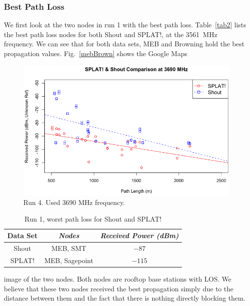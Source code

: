 \subsubsection{Best Path Loss}
We first look at the two nodes in run 1 with the best path loss. Table~\ref{tab2} lists the best path loss nodes for both Shout and 
SPLAT!, at the 3561~MHz frequency. We can see that for both data sets, MEB and Browning hold the best propagation values. 
Fig.~\ref{mebBrown} shows the Google Maps
\begin{figure}[htbp]
\centerline{\includegraphics[width=0.9\columnwidth]{figs/3690.png}}
\vspace{-3mm}
\caption{Run 4. Used 3690 MHz frequency.}
\label{3690}
\vspace{-3mm}
\end{figure}
\begin{table}[htbp]
\caption{Run 1, worst path loss for Shout and SPLAT!}
\begin{center}
\begin{tabular}{|c|c|c|}
\hline
\textbf{Data Set} & \textbf{\textit{Nodes}}& \textbf{\textit{Received Power (dBm)}} \\
\hline
Shout& MEB, SMT& $-87$ \\
SPLAT!& MEB, Sagepoint& $-115$ \\
\hline
\end{tabular}
\label{tab3}
\vspace{-3mm}
\end{center}
\end{table}
image of the two nodes. Both nodes are rooftop base stations with LOS. We believe that these two nodes received the
best propagation simply due to the distance between them and the fact that there is 
nothing directly blocking them.  


